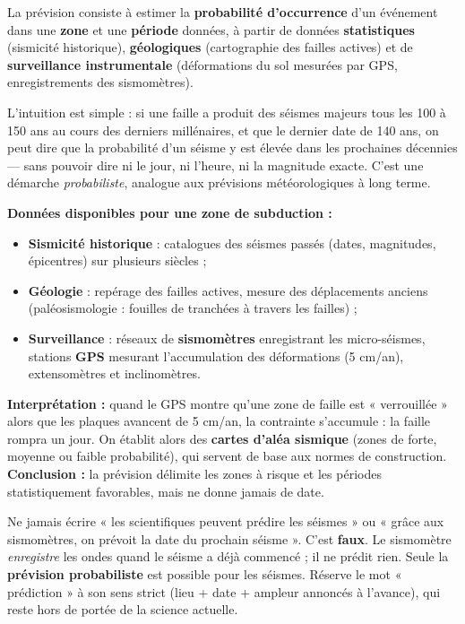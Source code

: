 \documentclass[11pt]{article}
\newcommand{\cle}[1]{{\popxbold\color{popdark}#1}}
\begin{document}
\begin{definition}[Prévision]
La \cle{prévision} consiste à estimer la \textbf{probabilité d'occurrence} d'un événement dans une \textbf{zone} et une \textbf{période} données, à partir de données \textbf{statistiques} (sismicité historique), \textbf{géologiques} (cartographie des failles actives) et de \textbf{surveillance instrumentale} (déformations du sol mesurées par GPS, enregistrements des sismomètres).
\end{definition}

L'intuition est simple : si une faille a produit des séismes majeurs tous les 100 à 150 ans au cours des derniers millénaires, et que le dernier date de 140 ans, on peut dire que la probabilité d'un séisme y est élevée dans les prochaines décennies — sans pouvoir dire ni le jour, ni l'heure, ni la magnitude exacte. C'est une démarche \emph{probabiliste}, analogue aux prévisions météorologiques à long terme.

\begin{experience}
\textbf{Données disponibles pour une zone de subduction :}
\begin{itemize}
\item \textbf{Sismicité historique} : catalogues des séismes passés (dates, magnitudes, épicentres) sur plusieurs siècles ;
\item \textbf{Géologie} : repérage des failles actives, mesure des déplacements anciens (paléosismologie : fouilles de tranchées à travers les failles) ;
\item \textbf{Surveillance} : réseaux de \textbf{sismomètres} enregistrant les micro-séismes, stations \textbf{GPS} mesurant l'accumulation des déformations (5 cm/an), extensomètres et inclinomètres.
\end{itemize}
\textbf{Interprétation :} quand le GPS montre qu'une zone de faille est « verrouillée » alors que les plaques avancent de 5 cm/an, la contrainte s'accumule : la faille rompra un jour. On établit alors des \textbf{cartes d'aléa sismique} (zones de forte, moyenne ou faible probabilité), qui servent de base aux normes de construction.
\textbf{Conclusion :} la prévision délimite les zones à risque et les périodes statistiquement favorables, mais ne donne jamais de date.
\end{experience}

\begin{attention}
Ne jamais écrire « les scientifiques peuvent prédire les séismes » ou « grâce aux sismomètres, on prévoit la date du prochain séisme ». C'est \textbf{faux}. Le sismomètre \emph{enregistre} les ondes quand le séisme a déjà commencé ; il ne prédit rien. Seule la \textbf{prévision probabiliste} est possible pour les séismes. Réserve le mot « prédiction » à son sens strict (lieu + date + ampleur annoncés à l'avance), qui reste hors de portée de la science actuelle.
\end{attention}
\end{document}
